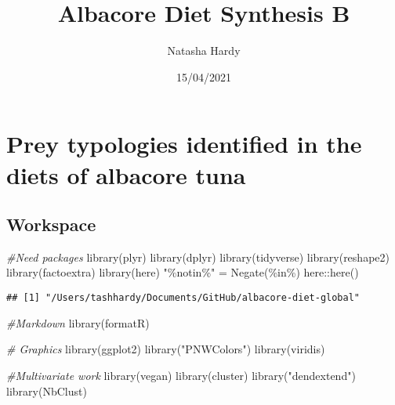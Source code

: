 \documentclass[
]{article}
\title{Albacore Diet Synthesis B}
\author{Natasha Hardy}
\date{15/04/2021}
\newenvironment{Shaded}{\begin{snugshade}}{\end{snugshade}}
\newcommand{\CommentTok}[1]{\textcolor[rgb]{0.56,0.35,0.01}{\textit{#1}}}
\newcommand{\FunctionTok}[1]{\textcolor[rgb]{0.00,0.00,0.00}{#1}}
\newcommand{\NormalTok}[1]{#1}
\newcommand{\OtherTok}[1]{\textcolor[rgb]{0.56,0.35,0.01}{#1}}
\newcommand{\SpecialCharTok}[1]{\textcolor[rgb]{0.00,0.00,0.00}{#1}}
\newcommand{\StringTok}[1]{\textcolor[rgb]{0.31,0.60,0.02}{#1}}
\begin{document}
\maketitle

\hypertarget{prey-typologies-identified-in-the-diets-of-albacore-tuna}{%
\section{Prey typologies identified in the diets of albacore
tuna}\label{prey-typologies-identified-in-the-diets-of-albacore-tuna}}

\hypertarget{workspace}{%
\subsection{Workspace}\label{workspace}}

\begin{Shaded}
\begin{Highlighting}[]
\CommentTok{\#Need packages}
\FunctionTok{library}\NormalTok{(plyr)}
\FunctionTok{library}\NormalTok{(dplyr)}
\FunctionTok{library}\NormalTok{(tidyverse)}
\FunctionTok{library}\NormalTok{(reshape2)}
\FunctionTok{library}\NormalTok{(factoextra)}
\FunctionTok{library}\NormalTok{(here)}
\StringTok{"\%notin\%"} \OtherTok{=} \FunctionTok{Negate}\NormalTok{(}\StringTok{\textquotesingle{}\%in\%\textquotesingle{}}\NormalTok{)}
\NormalTok{here}\SpecialCharTok{::}\FunctionTok{here}\NormalTok{()}
\end{Highlighting}
\end{Shaded}

\begin{verbatim}
## [1] "/Users/tashhardy/Documents/GitHub/albacore-diet-global"
\end{verbatim}

\begin{Shaded}
\begin{Highlighting}[]
\CommentTok{\#Markdown}
\FunctionTok{library}\NormalTok{(formatR)}

\CommentTok{\# Graphics}
\FunctionTok{library}\NormalTok{(ggplot2)}
\FunctionTok{library}\NormalTok{(}\StringTok{"PNWColors"}\NormalTok{)}
\FunctionTok{library}\NormalTok{(viridis)}

\CommentTok{\#Multivariate work}
\FunctionTok{library}\NormalTok{(vegan)}
\FunctionTok{library}\NormalTok{(cluster)}
\FunctionTok{library}\NormalTok{(}\StringTok{"dendextend"}\NormalTok{)}
\FunctionTok{library}\NormalTok{(NbClust)}
\end{Highlighting}
\end{Shaded}
\end{document}
